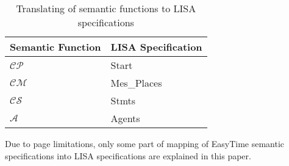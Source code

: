 \documentclass[preprint, prX]{revtex4}
\begin{document}
\begin{table}[htb]
\caption{Translating of semantic functions to LISA specifications}
\label{tab:tab2}
\vspace{-5mm}
\begin{center}
\begin{tabular}{ l l }
\hline
 Semantic Function & LISA Specification \\
\hline
 $\mathcal{CP}$ & Start \\
 $\mathcal{CM}$ & Mes\_Places \\
 $\mathcal{CS}$ & Stmts \\
 $\mathcal{A}$ & Agents \\
\hline
\end{tabular}
\end{center}
\end{table}

Due to page limitations, only some part of mapping of EasyTime semantic specifications into LISA specifications are explained in this
paper.
\end{document}
